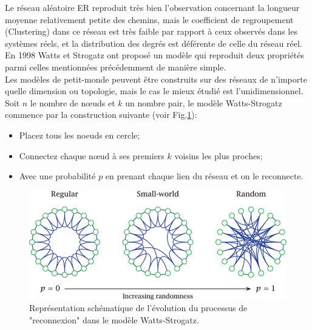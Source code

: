  
 Le réseau aléatoire ER reproduit très bien l'observation concernant la longueur moyenne relativement petite des chemins, mais le coefficient de regroupement (Clustering) dans ce réseau est très faible par rapport à ceux observés dans les systèmes réels, et la distribution des degrés est déférente de celle du réseau réel. En 1998 Watts et Strogatz \cite{Watss-Strogatz1998} ont proposé un modèle qui reproduit deux propriétés parmi celles mentionnées précédemment de manière simple.\\
 Les modèles de petit-monde peuvent être construits sur des réseaux de n'importe quelle dimension ou topologie, mais le cas le mieux étudié est l'unidimensionnel. Soit $n$ le nombre de nœuds et $k$ un nombre pair, le modèle Watts-Strogatz commence par la construction suivante (voir Fig.\ref{SW1}): 
 \begin{itemize}
 	\item Placez tous les noeuds en cercle;
 	\item Connectez chaque nœud à ses premiers $k$ voisins les plus proches;
 	\item  Avec une probabilité $p$ en prenant chaque lien du réseau et on le reconnecte.
 \end{itemize}
 \begin{figure}[h!]
 	\centering
 	\includegraphics[scale=0.6]{./figures/SW1}
 	\caption{Représentation schématique de l'évolution du processus de "reconnexion" dans le modèle Watts-Strogatz.}  	
 	\label{SW1}
 \end{figure}
 
